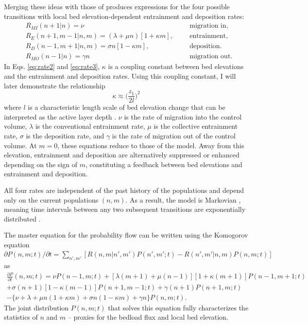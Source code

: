 Merging these ideas with those of \citet{Ancey2008} produces expressions for the four possible transitions with local bed elevation-dependent entrainment and deposition rates:
\begin{align}
	&R_{MI}(n+1|n) = \nu && &\text{migration in}, \label{eq:rate1}\\
	&R_E(n+1,m-1|n,m)=(\lambda + \mu n)[1 + \kappa m], && &\text{entrainment}, \label{eq:rate2}\\
	&R_D(n-1,m+1|n,m)=\sigma n [1- \kappa m ], && &\text{deposition}. \label{eq:rate3} \\
	&R_{MO}(n-1|n) =\gamma n && &\text{migration out} \label{eq:rate4}.
\end{align}
In Eqs. \ref{eq:rate2} and \ref{eq:rate3}, $\kappa$ is a coupling constant between bed elevations and the entrainment and deposition rates.
Using this coupling constant, I will later demonstrate the relationship
\begin{equation}\kappa \approx \big(\frac{z_1}{2l}\big)^2 \label{eq:active}
\end{equation}
where $l$ is a characteristic length scale of bed elevation change that can be interpreted as the active layer depth \citep{Wong2007,Church2017}.
$\nu$ is the rate of migration into the control volume, $\lambda$ is the conventional entrainment rate, $\mu$ is the collective entrainment rate, $\sigma$ is the deposition rate, and $\gamma$ is the rate of migration out of the control volume.
At $m=0$, these equations reduce to those of the \citet{Ancey2008} model.
Away from this elevation, entrainment and deposition are alternatively suppressed or enhanced depending on the sign of $m$, constituting a feedback between bed elevations and entrainment and deposition.

All four rates are independent of the past history of the populations and depend only on the current populations $(n,m)$. 
As a result, the model is Markovian \citep{Cox1965, VanKampen2007}, meaning time intervals between any two subsequent transitions are exponentially distributed \citep{Gillespie2007}.

The master equation for the probability flow can be written using the Komogorov equation
 $\partial P(n,m;t)/\partial t = 
\sum_{n',m'} [R(n,m|n',m')P(n',m';t)-R(n',m'|n,m)P(n,m;t)]$ \citep{Cox1965, Gillespie1991, Ancey2008} as 
\begin{multline}
	\frac{\partial P}{\partial t}(n,m;t) =  
	\nu P(n-1,m;t) + [\lambda(m+1) + \mu(n-1)][1+\kappa(m+1)]P(n-1,m+1;t)\\  
	+ \sigma(n+1)[1-\kappa(m-1)]P(n+1,m-1;t) + \gamma(n+1) P(n+1,m;t) \\
	- 
	\{ \nu + \lambda+ \mu n (1+\kappa m) +  \sigma n ( 1- \kappa m) + \gamma n \}P(n,m;t).
	\label{eq:elemaster}
\end{multline}
The joint distribution $P(n,m;t)$ that solves this equation fully characterizes the statistics of $n$ and $m$ -- proxies for the bedload flux and local bed elevation.


